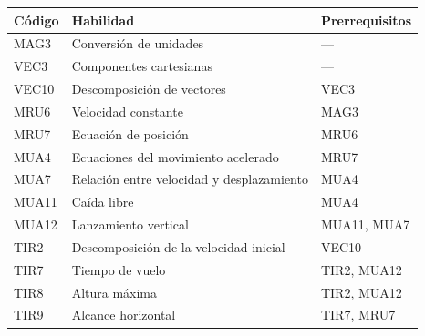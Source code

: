 \documentclass[11pt]{article}
\theoremstyle{definition}
\theoremstyle{remark}
\begin{document}
\begin{center}\small
\begin{tabular}{@{}lll@{}}
\toprule
Código & Habilidad & Prerrequisitos \\
\midrule
MAG3 & Conversión de unidades & --- \\
VEC3 & Componentes cartesianas & --- \\
VEC10 & Descomposición de vectores & VEC3 \\
MRU6 & Velocidad constante & MAG3 \\
MRU7 & Ecuación de posición & MRU6 \\
MUA4 & Ecuaciones del movimiento acelerado & MRU7 \\
MUA7 & Relación entre velocidad y desplazamiento & MUA4 \\
MUA11 & Caída libre & MUA4 \\
MUA12 & Lanzamiento vertical & MUA11, MUA7 \\
TIR2 & Descomposición de la velocidad inicial & VEC10 \\
TIR7 & Tiempo de vuelo & TIR2, MUA12 \\
TIR8 & Altura máxima & TIR2, MUA12 \\
TIR9 & Alcance horizontal & TIR7, MRU7 \\
\bottomrule
\end{tabular}
\end{center}


\end{document}
